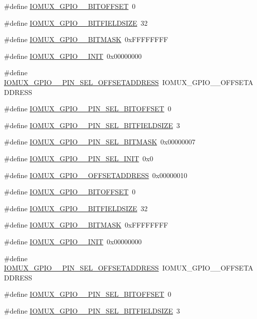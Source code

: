 \begin{DoxyCompactItemize}
\item 
\#define \hyperlink{a00560_ad145f8f996a644f54b63d21a13a40877}{IOMUX\_\-GPIO\_\_\-BITOFFSET}~0
\item 
\#define \hyperlink{a00560_a1acf29c11676066e33c80413163418e8}{IOMUX\_\-GPIO\_\_\-BITFIELDSIZE}~32
\item 
\#define \hyperlink{a00560_a4cddaa85cd9f4ef004ed9e40c13a1df7}{IOMUX\_\-GPIO\_\_\-BITMASK}~0xFFFFFFFF
\item 
\#define \hyperlink{a00560_a788558151fcd8476ea778cc207d6361f}{IOMUX\_\-GPIO\_\_\-INIT}~0x00000000
\item 
\#define \hyperlink{a00560_a72ceabd12a0394643bfbdc65d81ae808}{IOMUX\_\-GPIO\_\_\-PIN\_\-SEL\_\-OFFSETADDRESS}~IOMUX\_\-GPIO\_\_\-OFFSETADDRESS
\item 
\#define \hyperlink{a00560_a494f66cc43ce4325a218bcb1b31da886}{IOMUX\_\-GPIO\_\_\-PIN\_\-SEL\_\-BITOFFSET}~0
\item 
\#define \hyperlink{a00560_aa69a973a501d0c8cfde182c58de14502}{IOMUX\_\-GPIO\_\_\-PIN\_\-SEL\_\-BITFIELDSIZE}~3
\item 
\#define \hyperlink{a00560_a3d432f778f42256206f2bcb8f0058629}{IOMUX\_\-GPIO\_\_\-PIN\_\-SEL\_\-BITMASK}~0x00000007
\item 
\#define \hyperlink{a00560_af483270477c079bf9051ad87444c9de3}{IOMUX\_\-GPIO\_\_\-PIN\_\-SEL\_\-INIT}~0x0
\item 
\#define \hyperlink{a00560_ac6094ccf82eb719ae727aab87eb58f84}{IOMUX\_\-GPIO\_\_\-OFFSETADDRESS}~0x00000010
\item 
\#define \hyperlink{a00560_ad135b8590f27b1423ac2afc44059536e}{IOMUX\_\-GPIO\_\_\-BITOFFSET}~0
\item 
\#define \hyperlink{a00560_af5cddabac86d095e577cbf2675de86f3}{IOMUX\_\-GPIO\_\_\-BITFIELDSIZE}~32
\item 
\#define \hyperlink{a00560_ae963de1d7397696b416681bb64fb4ea8}{IOMUX\_\-GPIO\_\_\-BITMASK}~0xFFFFFFFF
\item 
\#define \hyperlink{a00560_a9d28c1454146a1f2bb889dec2c893b58}{IOMUX\_\-GPIO\_\_\-INIT}~0x00000000
\item 
\#define \hyperlink{a00560_a08312dd28ec9a6ba6ff20a2e707bab8f}{IOMUX\_\-GPIO\_\_\-PIN\_\-SEL\_\-OFFSETADDRESS}~IOMUX\_\-GPIO\_\_\-OFFSETADDRESS
\item 
\#define \hyperlink{a00560_a1426aaaa1c374eff13bdd59913e8b7d2}{IOMUX\_\-GPIO\_\_\-PIN\_\-SEL\_\-BITOFFSET}~0
\item 
\#define \hyperlink{a00560_a00271aab711d546ae162541adff62fab}{IOMUX\_\-GPIO\_\_\-PIN\_\-SEL\_\-BITFIELDSIZE}~3

\end{DoxyCompactItemize}
